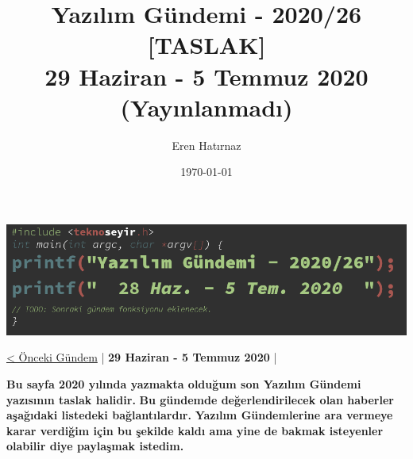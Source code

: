 \documentclass[11pt]{article}
\author{Eren Hatırnaz}
\date{\today}
\title{Yazılım Gündemi - 2020/26 [TASLAK]\\\medskip
\large 29 Haziran - 5 Temmuz 2020 (Yayınlanmadı)}
\begin{document}
\maketitle
\shorthandoff{=}

\begin{center}
\includegraphics[width=.9\linewidth]{gorseller/yazilim-gundemi-banner.png}
\end{center}

\begin{center}
\href{../25/yazilim-gundemi-2020-25.pdf}{< Önceki Gündem} | \textbf{29 Haziran - 5 Temmuz 2020} |
\end{center}

\textbf{\textbf{Bu sayfa 2020 yılında yazmakta olduğum son Yazılım Gündemi yazısının taslak
halidir.}} \textbf{\textbf{Bu gündemde değerlendirilecek olan haberler aşağıdaki listedeki
bağlantılardır.}} \textbf{\textbf{Yazılım Gündemlerine ara vermeye karar verdiğim için bu şekilde
kaldı ama yine de bakmak isteyenler olabilir diye paylaşmak istedim.}}
\end{document}
